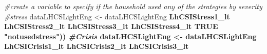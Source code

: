 \documentclass[
]{article}
\newenvironment{Shaded}{\begin{snugshade}}{\end{snugshade}}
\newcommand{\CommentTok}[1]{\textcolor[rgb]{0.56,0.35,0.01}{\textit{#1}}}
\newcommand{\DataTypeTok}[1]{\textcolor[rgb]{0.13,0.29,0.53}{#1}}
\newcommand{\KeywordTok}[1]{\textcolor[rgb]{0.13,0.29,0.53}{\textbf{#1}}}
\newcommand{\NormalTok}[1]{#1}
\newcommand{\OperatorTok}[1]{\textcolor[rgb]{0.81,0.36,0.00}{\textbf{#1}}}
\newcommand{\OtherTok}[1]{\textcolor[rgb]{0.56,0.35,0.01}{#1}}
\newcommand{\StringTok}[1]{\textcolor[rgb]{0.31,0.60,0.02}{#1}}
\begin{document}
\begin{Shaded}
\begin{Highlighting}[]
\CommentTok{#create a variable to specify if the household used any of the strategies by severity }
\CommentTok{#stress}
\NormalTok{dataLHCSLightEng <-}\StringTok{ }\NormalTok{dataLHCSLightEng }\OperatorTok{%>%}\StringTok{ }\KeywordTok{mutate}\NormalTok{(}\DataTypeTok{stress_coping =} \KeywordTok{case_when}\NormalTok{(}
\NormalTok{LhCSIStress1_lt }\OperatorTok{%in%}\StringTok{ }\KeywordTok{c}\NormalTok{(}\StringTok{"Yes"}\NormalTok{,}\StringTok{"No; because I already sold those assets or did this activity in the last 12 months and cannot continue to do it"}\NormalTok{) }\OperatorTok{~}\StringTok{ "usedstress"}\NormalTok{,}
\NormalTok{LhCSIStress2_lt }\OperatorTok{%in%}\StringTok{ }\KeywordTok{c}\NormalTok{(}\StringTok{"Yes"}\NormalTok{,}\StringTok{"No; because I already sold those assets or did this activity in the last 12 months and cannot continue to do it"}\NormalTok{) }\OperatorTok{~}\StringTok{ "usedstress"}\NormalTok{,}
\NormalTok{LhCSIStress3_lt }\OperatorTok{%in%}\StringTok{ }\KeywordTok{c}\NormalTok{(}\StringTok{"Yes"}\NormalTok{,}\StringTok{"No; because I already sold those assets or did this activity in the last 12 months and cannot continue to do it"}\NormalTok{) }\OperatorTok{~}\StringTok{ "usedstress"}\NormalTok{,}
\NormalTok{LhCSIStress4_lt }\OperatorTok{%in%}\StringTok{ }\KeywordTok{c}\NormalTok{(}\StringTok{"Yes"}\NormalTok{,}\StringTok{"No; because I already sold those assets or did this activity in the last 12 months and cannot continue to do it"}\NormalTok{) }\OperatorTok{~}\StringTok{ "usedstress"}\NormalTok{,}
\OtherTok{TRUE} \OperatorTok{~}\StringTok{ "notusedstress"}\NormalTok{))}
\CommentTok{#Crisis}
\NormalTok{dataLHCSLightEng <-}\StringTok{ }\NormalTok{dataLHCSLightEng }\OperatorTok{%>%}\StringTok{ }\KeywordTok{mutate}\NormalTok{(}\DataTypeTok{crisis_coping =} \KeywordTok{case_when}\NormalTok{(}
\NormalTok{LhCSICrisis1_lt }\OperatorTok{%in%}\StringTok{ }\KeywordTok{c}\NormalTok{(}\StringTok{"Yes"}\NormalTok{,}\StringTok{"No; because I already sold those assets or did this activity in the last 12 months and cannot continue to do it"}\NormalTok{) }\OperatorTok{~}\StringTok{ "usedcrisis"}\NormalTok{,}
\NormalTok{LhCSICrisis2_lt }\OperatorTok{%in%}\StringTok{ }\KeywordTok{c}\NormalTok{(}\StringTok{"Yes"}\NormalTok{,}\StringTok{"No; because I already sold those assets or did this activity in the last 12 months and cannot continue to do it"}\NormalTok{) }\OperatorTok{~}\StringTok{ "usedcrisis"}\NormalTok{,}
\NormalTok{LhCSICrisis3_lt }\OperatorTok{%in%}\StringTok{ }\KeywordTok{c}\NormalTok{(}\StringTok{"Yes"}\NormalTok{,}\StringTok{"No; because I already sold those assets or did this activity in the last 12 months and cannot continue to do it"}\NormalTok{) }\OperatorTok{~}\StringTok{ "usedcrisis"}\NormalTok{,}
}}}}}}}}}
\end{Highlighting}
\end{Shaded}
\end{document}
